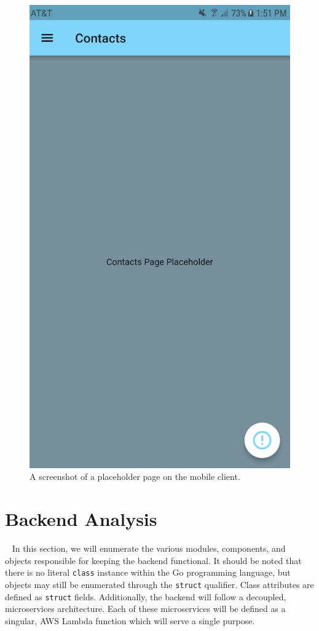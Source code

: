 \documentclass[10pt, a4paper]{article}
\begin{document}
\begin{figure}[!htb]
  \includegraphics[width=\linewidth]{demo_placeholderpage.png}
  \caption{A screenshot of a placeholder page on the mobile client.}\label{fig:mobile3}
\endminipage
\end{figure}

\section{Backend Analysis}
\par ~ In this section, we will enumerate the various modules, components, and objects responsible for keeping the backend functional. It should be noted that there is no literal \texttt{class} instance within the Go programming language, but objects may still be enumerated through the \texttt{struct} qualifier. Class attributes are defined as \texttt{struct} fields. Additionally, the backend will follow a decoupled, microservices architecture. Each of these microservices will be defined as a singular, AWS Lambda function which will serve a single purpose.
\end{document}
